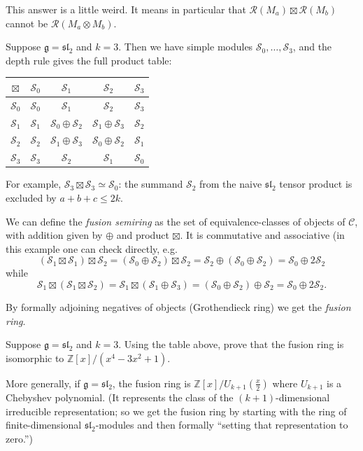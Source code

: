 \documentclass[12pt,letterpaper,reqno]{amsart}
\numberwithin{equation}{section}
\newcommand{\fg}{{\mathfrak g}}
\newcommand{\fsl}{{\mathfrak {sl}}}
\newcommand{\cC}{\ensuremath{\mathcal C}}
\newcommand{\cS}{\ensuremath{\mathcal S}}
\newcommand{\bbZ}{\ensuremath{\mathbb Z}}
\newcommand{\vrep}{\mathcal{R}}
\newcommand{\ti}[1]{\textit{#1}}
\begin{document}
This answer is a little weird. It means in particular that $\vrep(M_a) \boxtimes \vrep(M_b)$ cannot be $\vrep(M_a \otimes M_b)$.
\begin{example}
Suppose $\fg = \fsl_2$ and $k=3$.
Then we have simple modules $\cS_0, \dots, \cS_3$, and the depth rule gives the full product table:
\begin{center}
\renewcommand{\arraystretch}{1.15}
\begin{tabular}{c|cccc}
$\boxtimes$ & $\cS_0$ & $\cS_1$ & $\cS_2$ & $\cS_3$ \\ \hline
$\cS_0$ & $\cS_0$ & $\cS_1$ & $\cS_2$ & $\cS_3$ \\
$\cS_1$ & $\cS_1$ & $\cS_0 \oplus \cS_2$ & $\cS_1 \oplus \cS_3$ & $\cS_2$ \\
$\cS_2$ & $\cS_2$ & $\cS_1 \oplus \cS_3$ & $\cS_0 \oplus \cS_2$ & $\cS_1$ \\
$\cS_3$ & $\cS_3$ & $\cS_2$ & $\cS_1$ & $\cS_0$
\end{tabular}
\end{center}
For example, $\cS_3 \boxtimes \cS_3 \simeq \cS_0$: the summand $\cS_2$ from the naive
$\fsl_2$ tensor product is excluded by $a+b+c \le 2k$.
\end{example}

We can define the \ti{fusion semiring} as 
the set of equivalence-classes of objects 
of $\cC$, with addition given by $\oplus$ and product $\boxtimes$.
It is commutative and associative (in this example one can check directly, e.g.
\begin{equation}
(\cS_1 \boxtimes \cS_1)\boxtimes \cS_2
 = (\cS_0 \oplus \cS_2)\boxtimes \cS_2
 = \cS_2 \oplus (\cS_0 \oplus \cS_2)
 = \cS_0 \oplus 2\cS_2
\end{equation}
while
\begin{equation}
\cS_1\boxtimes(\cS_1\boxtimes \cS_2)
 = \cS_1\boxtimes(\cS_1 \oplus \cS_3)
 = (\cS_0 \oplus \cS_2)\oplus \cS_2
 = \cS_0 \oplus 2\cS_2.
\end{equation}

By formally adjoining negatives 
of objects (Grothendieck ring) we get the \ti{fusion ring}.
\begin{exercise}
Suppose $\fg = \fsl_2$ and $k=3$. Using the table above, prove that the fusion ring
is isomorphic to $\bbZ[x] / (x^4 - 3x^2 + 1)$.
\end{exercise}

\begin{example}
More generally, if $\fg = \fsl_2$, the fusion ring is 
$\bbZ[x] / U_{k+1}(\frac{x}{2})$ where $U_{k+1}$ is a Chebyshev polynomial.
(It represents the class of the $(k+1)$-dimensional irreducible
representation; so we get the fusion ring by starting with the 
ring of finite-dimensional $\fsl_2$-modules and then formally
``setting that representation to zero.'')
\end{example}
\end{document}
